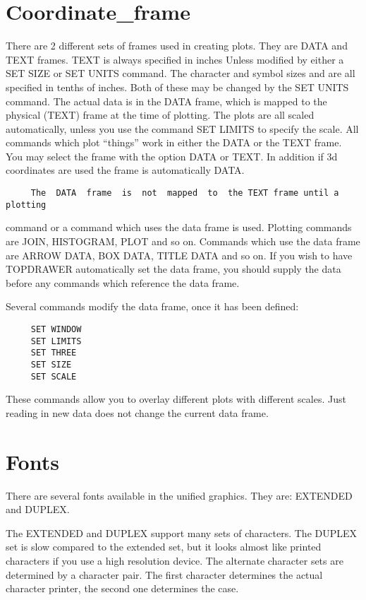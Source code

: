 \section{Coordinate\_frame}
There are 2 different sets of frames used in creating plots.  They are DATA
and TEXT frames.  TEXT is always specified in  inches  Unless  modified  by
either a SET SIZE or SET UNITS command.  The character and symbol sizes and
are all specified in tenths of inches.  Both of these may be changed by the
SET UNITS  command.   The actual data is in the DATA frame, which is mapped
to the physical (TEXT) frame at the time of plotting.  The  plots  are  all
scaled  automatically, unless you use the command SET LIMITS to specify the
scale.  All commands which plot ``things'' work in either  the  DATA  or  the
TEXT  frame.   You  may  select the frame with the option DATA or TEXT.  In
addition if 3d coordinates are used the frame is automatically DATA.  

\begin{verbatim}
     The  DATA  frame  is  not  mapped  to  the TEXT frame until a plotting
\end{verbatim}
command or a command which uses the data frame is used.  Plotting  commands
are JOIN, HISTOGRAM, PLOT and so on.  Commands which use the data frame are
ARROW DATA, BOX DATA, TITLE DATA and so on.  If you wish to have  TOPDRAWER
automatically  set  the  data  frame, you should supply the data before any
commands which reference the data frame.  

Several commands modify the data frame, once it has been defined:  
\begin{verbatim}
     SET WINDOW 
     SET LIMITS 
     SET THREE 
     SET SIZE 
     SET SCALE 
\end{verbatim}
These  commands allow you to overlay different plots with different scales.
Just reading in new data does not change the current data frame.  
\section{Fonts}
There  are  several  fonts  available  in  the unified graphics.  They are:
EXTENDED and DUPLEX.  

The EXTENDED and DUPLEX support many sets of characters.  The DUPLEX set is
slow compared to the  extended  set,  but  it  looks  almost  like  printed
characters  if  you  use a high resolution device.  The alternate character
sets are determined by a character pair.  The  first  character  determines
the actual character printer, the second one determines the case.  
